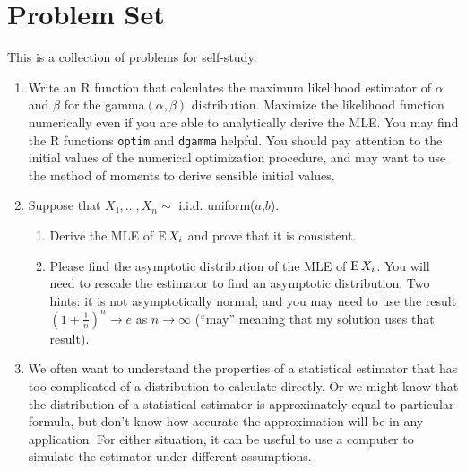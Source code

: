 
\part*{Problem Set}%

This is a collection of problems for self-study.

\begin{enumerate}

\item Write an R function that calculates the maximum likelihood
  estimator of $α$ and $β$ for the gamma$(α,β)$ distribution. Maximize
  the likelihood function numerically even if you are able to
  analytically derive the MLE.  You may find the R functions
  \texttt{optim} and \texttt{dgamma} helpful.  You should pay
  attention to the initial values of the numerical optimization
  procedure, and may want to use the method of moments to derive
  sensible initial values.

\item  Suppose that $X₁,…,X_n ∼$ i.i.d. uniform($a$,$b$).
  \begin{enumerate}
  \item Derive the MLE of $\operatorname{E} X_i$ and prove that it is consistent.
  \item Please find the asymptotic distribution of the MLE of $\operatorname{E}
    X_i$.  You will need to rescale the estimator to find an
    asymptotic distribution.  Two hints: it is not asymptotically
    normal; and you may need to use the result $(1 + \tfrac{1}{n})^n →
    e$ as $n → ∞$ (``may'' meaning that my solution uses that result).
  \end{enumerate}

\item We often want to understand the properties of a statistical
  estimator that has too complicated of a distribution to calculate
  directly.  Or we might know that the distribution of a statistical
  estimator is approximately equal to particular formula, but don't
  know how accurate the approximation will be in any application.  For
  either situation, it can be useful to use a computer to simulate the
  estimator under different assumptions.


\end{enumerate}
